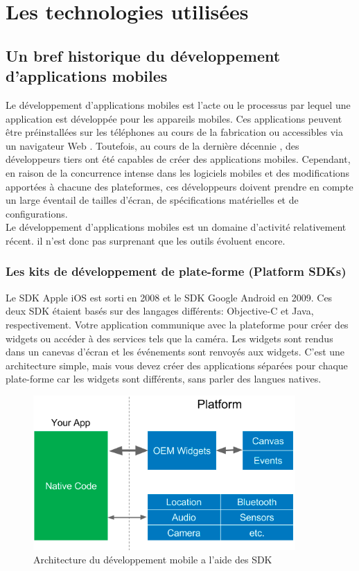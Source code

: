 

\chapter{Les technologies utilisées}

\section{Un bref historique du développement d'applications mobiles}
Le développement d'applications mobiles est l'acte ou le processus par lequel une application est développée pour les appareils mobiles. Ces applications peuvent être préinstallées sur les téléphones au cours de la fabrication ou accessibles via un navigateur Web \cite{noauthor_mobile_2019}. Toutefois, au cours de la dernière décennie \cite{leler_whats_2017}, des développeurs tiers ont été capables de créer des applications mobiles. Cependant, en raison de la concurrence intense dans les logiciels mobiles et des modifications apportées à chacune des plateformes, ces développeurs doivent prendre en compte un large éventail de tailles d'écran, de spécifications matérielles et de configurations.\\
\tab Le développement d'applications mobiles est un domaine d'activité relativement récent. il n’est donc pas surprenant que les outils évoluent encore.
\newpage

\subsection{Les kits de développement de plate-forme (Platform SDKs)}
Le SDK Apple iOS est sorti en 2008 et le SDK Google Android en 2009. Ces deux SDK étaient basés sur des langages différents: Objective-C et Java, respectivement.
Votre application communique avec la plateforme pour créer des widgets ou accéder à des services tels que la caméra. Les widgets sont rendus dans un canevas d’écran et les événements sont renvoyés aux widgets. C'est une architecture simple, mais vous devez créer des applications séparées pour chaque plate-forme car les widgets sont différents, sans parler des langues natives\cite{leler_whats_2017}.

\begin{figure}[h]
	\begin{center}
		\includegraphics[width=10cm]{Images/chapter2/platform_sdk.png}
		\caption{{\footnotesize Architecture du développement mobile a l'aide des SDK\cite{leler_whats_2017}}}
	\end{center}
\end{figure}

